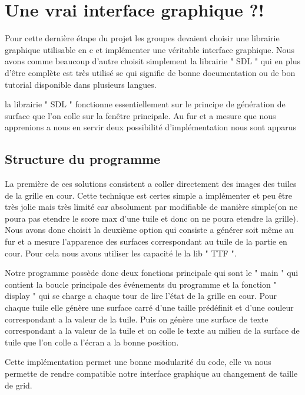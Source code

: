\documentclass[12pt]{article}
\begin{document}
\newpage
\section{Une vrai interface graphique ?!}
Pour cette dernière étape du projet les groupes devaient choisir une librairie graphique
utilisable en c et implémenter une véritable interface graphique. Nous avons comme
beaucoup d'autre choisit simplement la librairie " SDL " \cite{SDL} qui en
plus d’être complète est très utilisé se qui signifie de bonne documentation ou
de bon tutorial disponible dans plusieurs langues.\par la librairie " SDL "
fonctionne essentiellement sur le principe de génération de surface que l'on colle sur la fenêtre principale. Au fur et a mesure que nous apprenions a nous en servir
deux possibilité d’implémentation nous sont apparus

\subsection{Structure du programme}
La première de ces solutions consistent a coller directement des images des tuiles de la grille en cour.
Cette technique est certes simple a implémenter et peu être très jolie mais très limité
car absolument par modifiable de manière simple(on ne poura pas etendre le score max d'une tuile
et donc on ne poura etendre la grille).
Nous avons donc choisit la deuxième option qui consiste a générer soit même au fur et a mesure
l'apparence des surfaces correspondant au tuile de la partie en cour. Pour cela nous avons utiliser
les capacité le la lib " TTF ".
\par Notre programme possède donc deux fonctions principale qui sont le " main " qui contient la boucle
principale des événements du programme et la fonction " display " qui se charge a chaque tour de lire l'état
de la grille en cour. Pour chaque tuile elle génère une surface carré d'une taille prédéfinit et d'une couleur
correspondant a la valeur de la tuile. Puis on génère une surface de texte correspondant a la valeur de la tuile
et on colle le texte au milieu de la surface de tuile que l'on colle a l’écran a la bonne position.
\par Cette implémentation permet une bonne modularité du code, elle va nous permette de rendre compatible
 notre interface graphique au changement de taille de grid.
\end{document}
